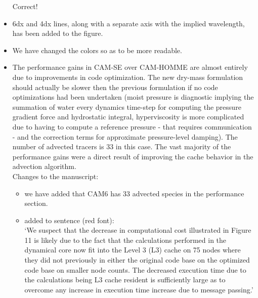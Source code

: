 \documentclass[11pt]{article}
\begin{document}
\begin{itemize}
Correct!

\item {\color{blue}{Figure 6: It is difficult to get a sense of the physical scales in the kinetic energy spectrum plot. Could either a second axis showing physical wavelengths, or a line indicating 6dx or 4dx scales, be added to the plot?}}

6dx and 4dx lines, along with a separate axis with the implied wavelength, has been added to the figure.

\item {\color{blue}{Figure 7: Some of the colours, especially blue and purple, and red and magenta, are hard to tell apart. }}

We have changed the colors so as to be more readable.

\item {\color{blue}{Section 4.3: The performance gains in CAM-SE over CAM-HOMME are excellent. Is this due to code optimization, or have there been science-related changes that could also lead to speedups? Also, tracer advection can be a major cost in many numerical models. How many tracers are used for these benchmark tests, and how efficient is the tracer advection compared to the rest of the dynamics?}}

The performance gains in CAM-SE over CAM-HOMME are almost entirely due to improvements in code optimization. The new dry-mass formulation should actually be slower then the previous formulation if no code optimizations had been undertaken (moist pressure is diagnostic implying the summation of water every dynamics time-step for computing the pressure gradient force and hydrostatic integral, hyperviscosity is more complicated due to having to compute a reference pressure  - that requires communication - and the correction terms for approximate pressure-level damping).  The number of advected tracers is 33 in this case.  The vast majority of the performance gains were a direct result of improving the cache behavior in the advection algorithm.  \\

Changes to the manuscript:
\begin{itemize}
\item we have added that CAM6 has 33 advected species in the performance section.
\item added to sentence (red font):\\

`We suspect that the decrease in computational cost illustrated in Figure 11 is likely due to the fact that the calculations performed in the dynamical core {\color{red}{(in particular tracer advection code)}} now fit into the Level 3 (L3) cache on 75 nodes where they did not previously in either the original code base on the optimized code base on smaller node counts.  The decreased execution time due to the calculations being L3 cache resident is sufficiently large as to overcome any increase in execution time increase due to message passing.'
\end{itemize}


\end{itemize}
\end{document}
